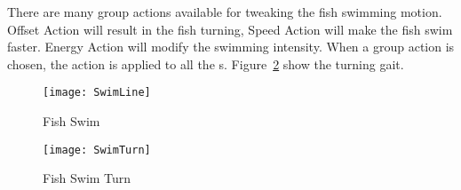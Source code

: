 There are many group actions available for tweaking the fish swimming motion.
Offset Action will result in the fish turning,
Speed Action will make the fish swim faster.
Energy Action will modify the swimming intensity.
When a group action is chosen, the action is applied to all the {\dof}s.
Figure~\ref{fig:fishswimturn} show the turning gait.


\begin{figure}[!htbp]
\begin{center}
      \texttt{[image: SwimLine]}
    \caption{Fish Swim}
    \label{fig:fishswimline}
\end{center}
\end{figure}


\begin{figure}[!htbp]
\begin{center}
      \texttt{[image: SwimTurn]}
    \caption{Fish Swim Turn}
    \label{fig:fishswimturn}
\end{center}
\end{figure}









